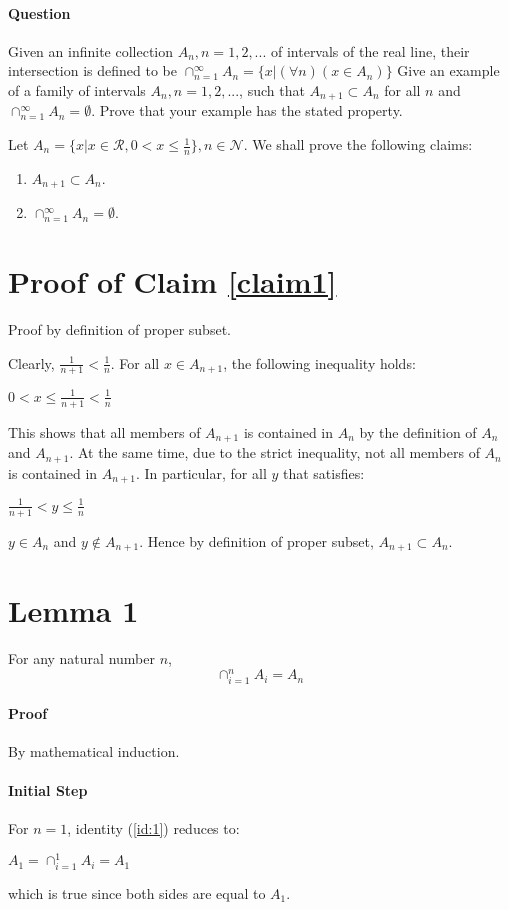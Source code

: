 \documentclass[14pt]{extarticle}
\begin{document}
	\paragraph{Question} Given an infinite collection $A_n, n=1,2, ...$ of intervals of the real line, their intersection is defined to be $\cap_{n=1}^\infty A_n=\{x|(\forall n)(x\in A_n)\}$ Give an example of a family of intervals $A_n, n=1,2, ...$, such that $A_{n+1} \subset A_n$ for all $n$ and $\cap_{n=1}^\infty A_n=\emptyset$. Prove that your example has the stated property.
	\par\bigskip
	Let $A_n = \{x|x \in \mathcal{R}, 0 < x \le \frac{1}{n}\}, n \in \mathcal{N}$.  We shall prove the following claims:
	\begin{enumerate}
		\item $A_{n+1} \subset A_n$.\label{claim1}
		\item $\cap_{n=1}^\infty A_n=\emptyset$.
	\end{enumerate}
	\section{Proof of Claim \ref{claim1}} Proof by definition of proper subset.
	\par\bigskip
	Clearly, $\frac{1}{n+1} < \frac{1}{n}$.  For all $x \in A_{n+1}$, the following inequality holds:
	\begin{center}
	$0 < x \le \frac{1}{n+1} < \frac{1}{n}$
	\end{center}
	This shows that all members of $A_{n+1}$ is contained in $A_n$ by the definition of $A_n$ and $A_{n+1}$.  At the same time, due to the strict inequality, not all members of $A_n$ is contained in $A_{n+1}$.  In particular, for all $y$ that satisfies:
	\begin{center}
		$ \frac{1}{n+1} < y \le \frac{1}{n}$
	\end{center}
	$y \in A_n$ and $y \notin A_{n+1}$.	 Hence by definition of proper subset, $A_{n+1} \subset A_n$.
	\section{Lemma 1}
	For any natural number $n$,
	\begin{equation}\label{id:1}
	\cap_{i=1}^n A_i= A_n
	\end{equation}
	\paragraph{Proof} By mathematical induction.
	\paragraph{Initial Step} For $n=1$, identity (\ref{id:1}) reduces to:
	\begin{center}
		$A_1 = \cap_{i=1}^1 A_i= A_1$
	\end{center}	
	which is true since both sides are equal to $A_1$.
\end{document}
